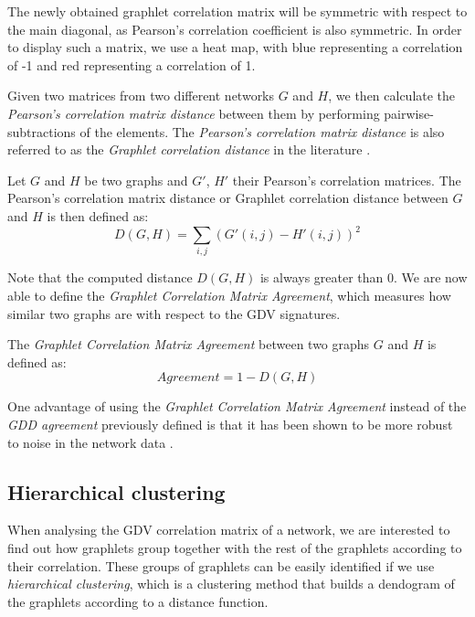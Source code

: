 The newly obtained graphlet correlation matrix will be symmetric with respect to 
the main diagonal, as Pearson's correlation coefficient is also symmetric. In
order to display such a matrix, we use a heat map, with blue representing a correlation of -1 and red representing a correlation of 1.

Given two matrices from two different networks $G$ and $H$, we then calculate
the \emph{Pearson's correlation matrix distance} between them by performing pairwise-subtractions of the elements. The \emph{Pearson's correlation matrix distance} is also referred to as the \emph{Graphlet correlation distance} in the literature \cite{yaverouglu2014revealing}.

\begin{mydef}
\label{def:gcd}
 Let $G$ and $H$ be two graphs and $G'$, $H'$ their Pearson's correlation matrices. The Pearson's correlation matrix distance or Graphlet correlation distance between $G$ and $H$ is then defined as:
 \begin{equation}
\label{pears_matrix_diff}
  D(G,H) = \sum_{i,j}\left(G'(i,j) - H'(i,j)\right)^2
\end{equation}
 
\end{mydef}

Note that the computed distance $D(G,H)$ is always greater than 0. We are now able to define the \emph{Graphlet Correlation Matrix Agreement}, which measures how similar two graphs are with respect to the GDV signatures.

\begin{mydef}
The \emph{Graphlet Correlation Matrix Agreement} between two graphs $G$ and $H$ is
defined as: 
 \begin{equation}
 Agreement = 1 - D(G,H)
 \end{equation}
\end{mydef}

One advantage of using the \emph{Graphlet Correlation Matrix Agreement} instead of the \emph{GDD agreement} previously defined is that it has been shown to be more robust to noise in the network data \cite{kuchaiev2009learning}.

\subsection{Hierarchical clustering}
\label{hier_clust}

When analysing the GDV correlation matrix of a network, we are interested to find out 
how graphlets group together with the rest of the graphlets according to their correlation. 
These groups of graphlets can be easily identified if we use \emph{hierarchical clustering}, 
which is a clustering method that builds a dendogram of the graphlets according to a distance function. 

